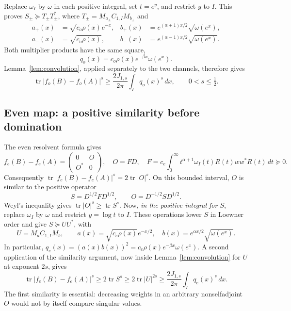 \documentclass[11pt]{article}
\numberwithin{equation}{section}
\newcommand{\tr}{\operatorname{tr}}
\begin{document}
Replace $\omega_I$ by $\omega$ in each positive integral, set $t=e^y$,
and restrict $y$ to $I$. This proves $S_\pm\succeq T_\pm T_\pm^*$,
where $T_\pm=M_{a_\pm}C_{1,I}M_{b_\pm}$ and
\begin{align*}
 a_+(x)&=\sqrt{c_o\rho(x)}e^{-x},&
 b_+(x)&=e^{(\alpha+1)x/2}\sqrt{\omega(e^x)},\\
 a_-(x)&=\sqrt{c_o\rho(x)},&
 b_-(x)&=e^{(\alpha-1)x/2}\sqrt{\omega(e^x)}.
\end{align*}
Both multiplier products have the same square,
\begin{equation}\label{eq:odd-q}
 q_o(x)=c_o\rho(x)e^{-\beta x}\omega(e^x).
\end{equation}
Lemma~\ref{lem:convolution}, applied separately to the two channels,
therefore gives
\begin{equation}\label{eq:odd-lower-I}
 \tr|f_o(B)-f_o(A)|^s
       \ge\frac{2J_{1,s}}{2\pi}\int_I q_o(x)^s\,dx,
       \qquad 0<s\le\tfrac12.
\end{equation}

\subsection*{Even map: a positive similarity before domination}
The even resolvent formula gives
\begin{equation}\label{eq:even-block}
 f_e(B)-f_e(A)=\begin{pmatrix}0&O\\O^*&0\end{pmatrix},
 \quad O=FD,\quad
 F=c_e\int_0^\infty t^{\alpha+1}\omega_I(t)R(t)ww^*R(t)\,dt\succeq0.
\end{equation}
Consequently $\tr|f_e(B)-f_e(A)|^s=2\tr|O|^s$.
On this bounded interval, $O$ is similar to the positive operator
\[
 S=D^{1/2}FD^{1/2},\qquad O=D^{-1/2}SD^{1/2}.
\]
Weyl's inequality gives $\tr|O|^s\ge\tr S^s$.
Now, \emph{in the positive integral for $S$}, replace $\omega_I$ by
$\omega$ and restrict $y=\log t$ to $I$. These operations lower $S$
in Loewner order and give $S\succeq UU^*$, with
\begin{equation}\label{eq:even-factor}
 U=M_aC_{1,I}M_b,\qquad
 a(x)=\sqrt{c_e\rho(x)}e^{-x/2},\quad
 b(x)=e^{\alpha x/2}\sqrt{\omega(e^x)}.
\end{equation}
In particular,
$q_e(x)=(a(x)b(x))^2=c_e\rho(x)e^{-\beta x}\omega(e^x)$.
A second application of the similarity argument, now inside
Lemma~\ref{lem:convolution} for $U$ at exponent $2s$, gives
\begin{equation}\label{eq:even-lower-I}
 \tr|f_e(B)-f_e(A)|^s
 \ge2\tr S^s\ge2\tr|U|^{2s}
 \ge\frac{2J_{1,s}}{2\pi}\int_I q_e(x)^s\,dx.
\end{equation}
The first similarity is essential: decreasing weights in an arbitrary
nonselfadjoint $O$ would not by itself compare singular values.
\end{document}
